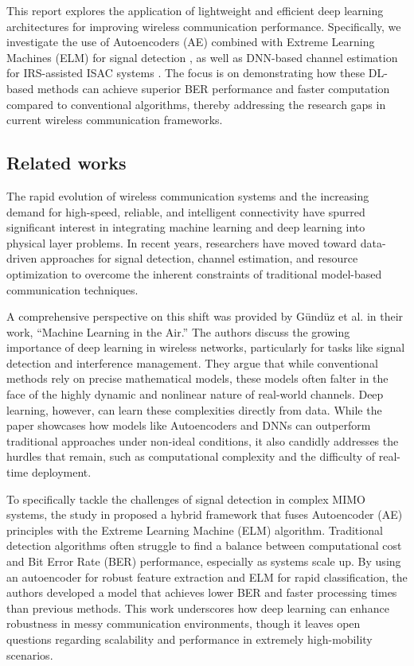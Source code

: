 \documentclass[10pt, conference]{IEEEtran}
\begin{document}
This report explores the application of lightweight and efficient deep learning architectures for improving wireless communication performance. Specifically, we investigate the use of Autoencoders (AE) combined with Extreme Learning Machines (ELM) for signal detection \cite{zhao2023}, as well as DNN-based channel estimation for IRS-assisted ISAC systems \cite{liu2022}. The focus is on demonstrating how these DL-based methods can achieve superior BER performance and faster computation compared to conventional algorithms, thereby addressing the research gaps in current wireless communication frameworks.



\subsection{Related works} 

The rapid evolution of wireless communication systems and the increasing demand for high-speed, reliable, and intelligent connectivity have spurred significant interest in integrating machine learning and deep learning into physical layer problems. In recent years, researchers have moved toward data-driven approaches for signal detection, channel estimation, and resource optimization to overcome the inherent constraints of traditional model-based communication techniques.

A comprehensive perspective on this shift was provided by Gündüz et al. \cite{gunduz2019} in their work, ``Machine Learning in the Air.'' The authors discuss the growing importance of deep learning in wireless networks, particularly for tasks like signal detection and interference management. They argue that while conventional methods rely on precise mathematical models, these models often falter in the face of the highly dynamic and nonlinear nature of real-world channels. Deep learning, however, can learn these complexities directly from data. While the paper showcases how models like Autoencoders and DNNs can outperform traditional approaches under non-ideal conditions, it also candidly addresses the hurdles that remain, such as computational complexity and the difficulty of real-time deployment.

To specifically tackle the challenges of signal detection in complex MIMO systems, the study in \cite{zhao2023} proposed a hybrid framework that fuses Autoencoder (AE) principles with the Extreme Learning Machine (ELM) algorithm. Traditional detection algorithms often struggle to find a balance between computational cost and Bit Error Rate (BER) performance, especially as systems scale up. By using an autoencoder for robust feature extraction and ELM for rapid classification, the authors developed a model that achieves lower BER and faster processing times than previous methods. This work underscores how deep learning can enhance robustness in messy communication environments, though it leaves open questions regarding scalability and performance in extremely high-mobility scenarios.
\end{document}
